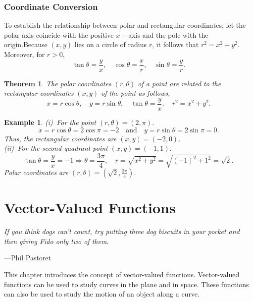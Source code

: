 \documentclass[titlepage,a4paper,12pt]{report}
\newtheorem{example}{Example}[section]
\newtheorem{theorem}{Theorem}[section]
\begin{document}
\subsection{Coordinate Conversion}
To establish the relationship between polar and rectangular coordinates, let the polar axis coincide with the positive $x-$axis and the pole with the origin.Because $(x,y)$ lies on a circle of radius $r$, it follows that $r^2=x^2+y^2$. Moreover, for $r>0$, 
\[\tan \theta =\dfrac{y}{x}, \quad \cos \theta =\dfrac{x}{r}, \quad \sin \theta = \dfrac{y}{r}.\]
\begin{theorem}
The polar coordinates $(r, \theta)$ of a point are related to the rectangular coordinates $(x,y)$ of the point as follows, 
\[x=r\cos \theta , \quad y=r\sin \theta , \quad \tan \theta =\dfrac{y}{x}, \quad r^2=x^2+y^2.\]
\end{theorem}
\begin{example}
(i)\, For the point $(r, \theta)=(2, \pi)$. 
\[x=r\cos \theta =2 \cos \pi =-2 \quad \mbox{and} \quad y=r\sin \theta = 2\sin \pi =0.\] Thus, the rectangular coordinates are $(x,y)=(-2,0)$.\\
(ii)\, For the second quadrant point $(x,y)=(-1,1)$.
\[\tan \theta =\dfrac{y}{x}=-1\Longrightarrow \theta = \dfrac{3\pi}{4}, \quad r=\sqrt{x^2+y^2}=\sqrt{(-1)^2+1^2}=\sqrt{2}.\] Polar coordinates are $(r, \theta)=(\sqrt{2}, \frac{3\pi}{4})$.
\end{example}
\chapter{Vector-Valued Functions}
\begin{center}
\small{\parbox{18cm}{
		\begin{raggedright}
		{\small
		\textit{If you think dogs can't count, try putting three dog biscuits in your pocket and then giving Fido only two of them.}
 }
 
				\vspace{.5cm}\hfill{---Phil Pastoret}
		\end{raggedright}
	}
} 
\end{center}
This chapter introduces the concept of vector-valued functions. Vector-valued functions can be used to study curves in the plane and in space. These functions can  also be used to study the motion of an object along a curve.
\end{document}
